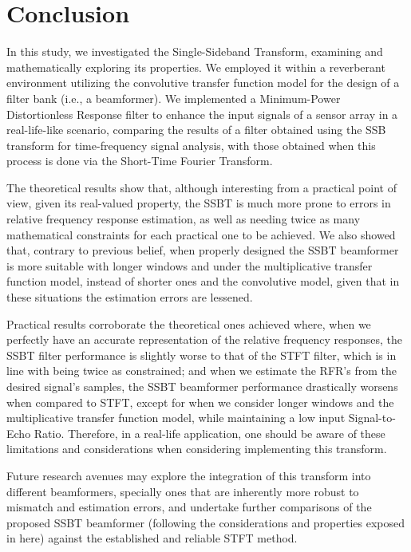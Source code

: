 \section{Conclusion}
\label{sec:conclusion}

In this study, we investigated the Single-Sideband Transform, examining and mathematically exploring its properties. We employed it within a reverberant environment utilizing the convolutive transfer function model for the design of a filter bank (i.e., a beamformer). We implemented a Minimum-Power Distortionless Response filter to enhance the input signals of a sensor array in a real-life-like scenario, comparing the results of a filter obtained using the SSB transform for time-frequency signal analysis, with those obtained when this process is done via the Short-Time Fourier Transform.

The theoretical results show that, although interesting from a practical point of view, given its real-valued property, the SSBT is much more prone to errors in relative frequency response estimation, as well as needing twice as many mathematical constraints for each practical one to be achieved. We also showed that, contrary to previous belief, when properly designed the SSBT beamformer is more suitable with longer windows and under the multiplicative transfer function model, instead of shorter ones and the convolutive model, given that in these situations the estimation errors are lessened.

Practical results corroborate the theoretical ones achieved where, when we perfectly have an accurate representation of the relative frequency responses, the SSBT filter performance is slightly worse to that of the STFT filter, which is in line with being twice as constrained; and when we estimate the RFR's from the desired signal's samples, the SSBT beamformer performance drastically worsens when compared to STFT, except for when we consider longer windows and the multiplicative transfer function model, while maintaining a low input Signal-to-Echo Ratio. Therefore, in a real-life application, one should be aware of these limitations and considerations when considering implementing this transform.

Future research avenues may explore the integration of this transform into different beamformers, specially ones that are inherently more robust to mismatch and estimation errors, and undertake further comparisons of the proposed SSBT beamformer (following the considerations and properties exposed in here) against the established and reliable STFT method.